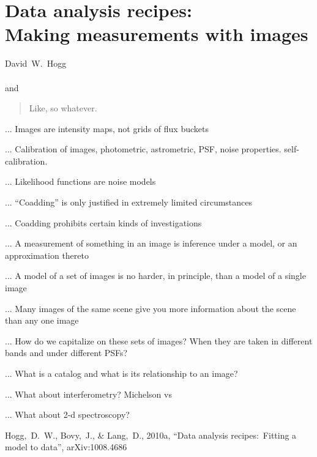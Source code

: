 \documentclass[12pt,twoside,pdftex]{article}
\begin{document}
\thispagestyle{plain}\raggedbottom
\section*{Data analysis recipes:\\
  Making measurements with images\footnotemark}


\noindent
David~W.~Hogg\\
\\
and~

\begin{abstract}
Like, so whatever.
\end{abstract}

... Images are intensity maps, not grids of flux buckets

... Calibration of images, photometric, astrometric, PSF, noise properties.  self-calibration.

... Likelihood functions are noise models
 
... ``Coadding'' is only justified in extremely limited circumstances

... Coadding prohibits certain kinds of investigations

... A measurement of something in an image is inference under a model, or an approximation thereto

... A model of a set of images is no harder, in principle, than a model of a single image

... Many images of the same scene give you more information about the scene than any one image

... How do we capitalize on these sets of images?  When they are taken in different bands and under different PSFs?

... What is a catalog and what is its relationship to an image?

... What about interferometry?  Michelson vs 

... What about 2-d spectroscopy?

\clearpage
{}\theendnotes

\clearpage
\begin{thebibliography}{}\raggedright
{}
  Hogg,~D.~W., Bovy,~J., \& Lang,~D., 2010a,
  ``Data analysis recipes:\ Fitting a model to data'', arXiv:1008.4686
\end{thebibliography}
\end{document}
